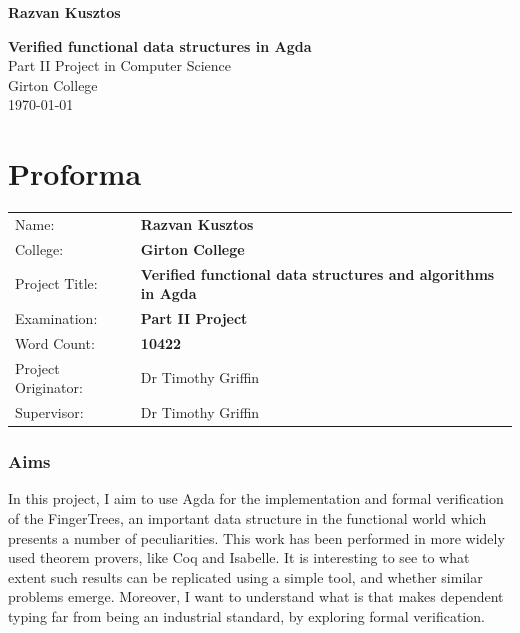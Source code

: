 \documentclass[12pt,twoside,notitlepage]{report}
\begin{document}





\pagestyle{empty}

\hfill{\LARGE \bf Razvan Kusztos}

\vspace*{60mm}
\begin{center}
\Huge
{\bf Verified functional data structures in Agda} \\
\vspace*{5mm}
Part II Project in Computer Science\\
\vspace*{5mm}
Girton College \\
\vspace*{5mm}
\today  %
\end{center}

\cleardoublepage


\linespread{1.5}



\setcounter{page}{1}
\pagestyle{plain}

\chapter*{Proforma}

{\large
\begin{tabular}{ll}
Name:               & \bf Razvan Kusztos                       \\
College:            & \bf Girton College                     \\
Project Title:      & \bf Verified functional data structures and algorithms in Agda \\
Examination:        & \bf Part II Project        \\
Word Count:         & \bf 10422 \\
Project Originator: & Dr Timothy Griffin                    \\
Supervisor:         & Dr Timothy Griffin                    \\
\end{tabular}
}

\subsection*{Aims}
In this project, I aim to use Agda for the implementation and formal verification of the FingerTrees, an important data structure in the functional world which presents a number of peculiarities. This work has been performed in more widely used theorem provers, like Coq and Isabelle. It is interesting to see to what extent such results can be replicated using a simple tool, and whether similar problems emerge.
Moreover, I want to understand what is that makes dependent typing far from being an industrial standard, by exploring formal verification.
\end{document}
